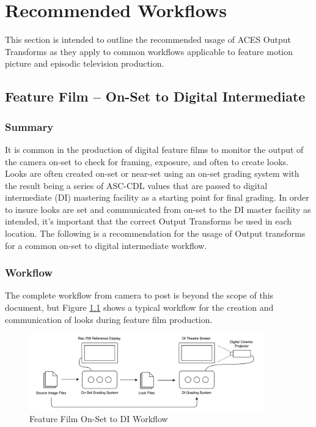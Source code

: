 \numberedformat

\clearpage
\chapter{Recommended Workflows}
\label{ch:rec-workflows}
This section is intended to outline the recommended usage of ACES Output Transforms as they apply to common workflows applicable to feature motion picture and episodic television production.


\section{Feature Film -- On-Set to Digital Intermediate}

\subsection{Summary}
It is common in the production of digital feature films to monitor the output of the camera on-set to check for framing, exposure, and often to create looks.  Looks are often created on-set or near-set using an on-set grading system with the result being a series of ASC-CDL values that are passed to digital intermediate (DI) mastering facility as a starting point for final grading.  In order to insure looks are set and communicated from on-set to the DI master facility as intended, it's important that the correct Output Transforms be used in each location.  The following is a recommendation for the usage of Output transforms for a common on-set to digital intermediate workflow.

\subsection{Workflow}
The complete workflow from camera to post is beyond the scope of this document, but Figure \ref{fig:workflow1} shows a typical workflow for the creation and communication of looks during feature film production.

\begin{figure}[ht!]
\centering
    \includegraphics[width=4in]{images/workflows/workflow1.pdf}
    \caption{\small Feature Film On-Set to DI Workflow}
    \label{fig:workflow1}
\end{figure}

